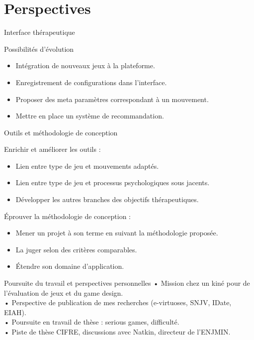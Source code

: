 \documentclass{beamer}
\begin{document}
	\section{Perspectives}
		\begin{frame}{Interface thérapeutique}	
			\begin{block}{Possibilités d'évolution}		
				\begin{itemize}
					\item Intégration de nouveaux jeux à la plateforme. 
					\item Enregistrement de configurations dans l'interface.
					\item Proposer des meta paramètres correspondant à un mouvement.
					\item Mettre en place un système de recommandation.	
				\end{itemize}
			\end{block}
		\end{frame}
		
		\begin{frame}{Outils et méthodologie de conception}
			\begin{block}{Enrichir et améliorer les outils :}
				\begin{itemize}
					\item Lien entre type de jeu et mouvements adaptés.
					\item Lien entre type de jeu et processus psychologiques sous jacents.
					\item Développer les autres branches des objectifs thérapeutiques.
				\end{itemize}
			\end{block}
				\begin{block}{Éprouver la méthodologie de conception :}
					\begin{itemize}
						\item Mener un projet à son terme en suivant la méthodologie proposée.
						\item La juger selon des critères comparables.
						\item Étendre son domaine d'application.
					\end{itemize}
				\end{block}
		\end{frame}		
	
		\begin{frame}{Poursuite du travail et perspectives personnelles}
			• Mission chez un kiné pour de l'évaluation de jeux et du game design.\\
			• Perspective de publication de mes recherches (e-virtuoses, SNJV, IDate, EIAH).\\
			• Poursuite en travail de thèse : serious games, difficulté.\\
			• Piste de thèse CIFRE, discussions avec Natkin, directeur de l'ENJMIN.\\
		\end{frame}
		
\end{document}
